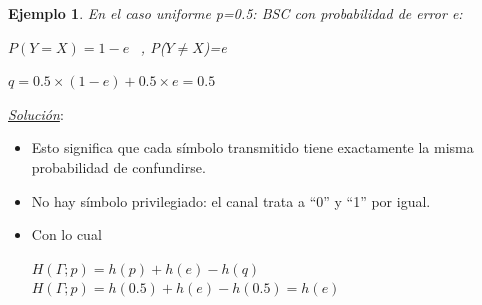 \documentclass{beamer}
\theoremstyle{plain}
\theoremstyle{example}
\theoremstyle{example}
\newtheorem{ejemplo} [Ejemplo] {Ejemplo}
\begin{document}
\begin{frame}  \small 

\begin{ejemplo} 
En el caso uniforme  p=0.5:
BSC con probabilidad de error e:
\begin{center}
$P(Y=X) = 1-e\;\;\;$,  P($Y \neq X$)=e    



    \begin{center}
    $q= 0.5 \times (1-e)+0.5 \times e=0.5$
    \end{center}

\end{center}

\end{ejemplo}

\textit{\underline{Solución}}:\\

\begin{itemize}
    \item Esto significa que cada símbolo transmitido tiene exactamente la misma probabilidad de confundirse.
    \item  No hay símbolo privilegiado: el canal trata a ``0'' y ``1'' por igual.

    \item Con lo cual 
    
    \begin{center}
    $H(\Gamma ;p) = h(p)+ h (e)- h (q)  $\\
    \vspace{0.3cm}
    $H(\Gamma ;p) = h(0.5)+ h (e)- h (0.5) = h(e) $
    \end{center}
    
\end{itemize}
\end{frame} 

\end{document}
